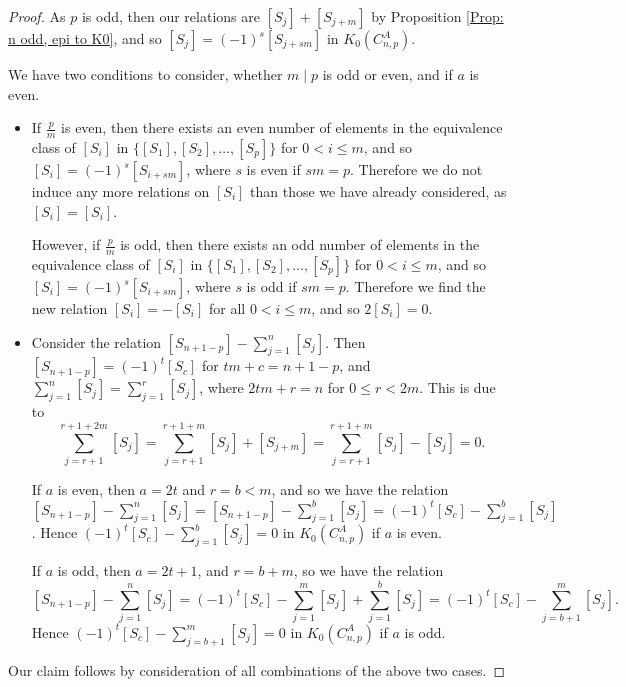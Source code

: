 \documentclass[a4paper,reqno,11pt]{amsart}
\theoremstyle{definition}
\begin{document}
\begin{proof}
	As $p$ is odd, then our relations are $[S_j] + [S_{j+m}]$ by Proposition \ref{Prop: n odd, epi to K0}, and so $[S_j] = (-1)^s[S_{j+sm}]$ in $K_0(C_{n,p}^A)$.
	
	We have two conditions to consider, whether $m \mid p$ is odd or even, and if $a$ is even.
	\begin{itemize}
		\item 	If $\frac{p}{m}$ is even, then there exists an even number of elements in the equivalence class of $[S_i]$ in $\{[S_1],[S_2], \ldots, [S_p]\}$ for $0 < i \leq m$, and so $[S_i] = (-1)^s[S_{i+sm}]$, where $s$ is even if $sm=p$.
		Therefore we do not induce any more relations on $[S_i]$ than those we have already considered, as $[S_i] = [S_i]$.
		
		However, if $\frac{p}{m}$ is odd, then there exists an odd number of elements in the equivalence class of $[S_i]$ in $\{[S_1],[S_2], \ldots, [S_p]\}$ for $0 < i \leq m$, and so $[S_i] = (-1)^s[S_{i+sm}]$, where $s$ is odd if $sm=p$.
		Therefore we find the new relation $[S_i] = -[S_i]$ for all $0 < i \leq m$, and so $2[S_i]=0$.\\
		
		\item Consider the relation $[S_{n+1-p}] - \sum_{j=1}^n [S_j]$.
		Then $[S_{n+1-p}] = (-1)^t[S_c]$ for $tm + c = n+1-p$, and $\sum_{j=1}^n [S_j] = \sum_{j=1}^r [S_j]$, where $2tm + r =n$ for $0 \leq r < 2m$.
		This is due to
		\[
		\sum_{j=r+1}^{r+1+2m} [S_j] = \sum_{j=r+1}^{r+1+m} [S_j] + [S_{j+m}] = \sum_{j=r+1}^{r+1+m} [S_j] - [S_j] = 0.
		\]
		
		If $a$ is even, then $a=2t$ and $r=b < m$, and so we have the relation $[S_{n+1-p}] - \sum_{j=1}^n [S_j] = [S_{n+1-p}] - \sum_{j=1}^b [S_j] = (-1)^t[S_c] - \sum_{j=1}^b [S_j]$.
		Hence $(-1)^t[S_c] - \sum_{j=1}^b [S_j] =0$ in $K_0(C_{n,p}^A)$ if $a$ is even.
		
		If $a$ is odd, then $a=2t+1$, and $r=b+m$, so we have the relation
		\[
		[S_{n+1-p}] - \sum_{j=1}^n [S_j] = (-1)^t[S_c] - \sum_{j=1}^m [S_j] + \sum_{j=1}^b [S_j] = (-1)^t [S_c] - \sum_{j=b+1}^m [S_j].
		\]
		Hence $(-1)^t [S_c] - \sum_{j=b+1}^m [S_j] = 0$ in $K_0(C_{n,p}^A)$ if $a$ is odd.
	\end{itemize}
	
	Our claim follows by consideration of all combinations of the above two cases.
\end{proof}
\end{document}
